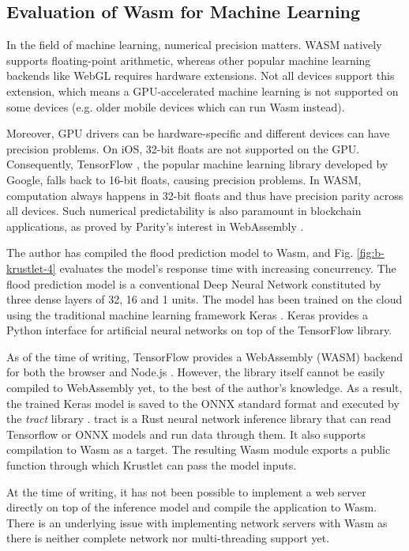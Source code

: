 \subsection{Evaluation of Wasm for Machine Learning}

In the field of machine learning, numerical precision matters. WASM natively supports floating-point arithmetic, whereas other popular machine learning backends like WebGL requires hardware extensions. Not all devices support this extension, which means a GPU-accelerated machine learning is not supported on some devices (e.g. older mobile devices which can run Wasm instead).

Moreover, GPU drivers can be hardware-specific and different devices can have precision problems. On iOS, 32-bit floats are not supported on the GPU. Consequently, TensorFlow \cite{tensorflow}, the popular machine learning library developed by Google, falls back to 16-bit floats, causing precision problems. In WASM, computation always happens in 32-bit floats and thus have precision parity across all devices. Such numerical predictability is also paramount in blockchain applications, as proved by Parity's interest in WebAssembly \cite{parity-wasm}.

The author has compiled the flood prediction model to Wasm, and Fig. \ref{fig:b-krustlet-4} evaluates the model's response time with increasing concurrency. The flood prediction model is a conventional Deep Neural Network constituted by three dense layers of 32, 16 and 1 units. The model has been trained on the cloud using the traditional machine learning framework Keras \cite{keras}. Keras provides a Python interface for artificial neural networks on top of the TensorFlow library.

As of the time of writing, TensorFlow provides a WebAssembly (WASM) backend for both the browser and Node.js \cite{tf-wasm}. However, the library itself cannot be easily compiled to WebAssembly yet, to the best of the author's knowledge. As a result, the trained Keras model is saved to the ONNX \cite{onnx} standard format and executed by the \emph{tract} library \cite{tract}. tract is a Rust neural network inference library that can read Tensorflow or ONNX models and run data through them. It also supports compilation to Wasm as a target. The resulting Wasm module exports a public function through which Krustlet can pass the model inputs. 

At the time of writing, it has not been possible to implement a web server directly on top of the inference model and compile the application to Wasm. There is an underlying issue with implementing network servers with Wasm as there is neither complete network nor multi-threading support yet.

